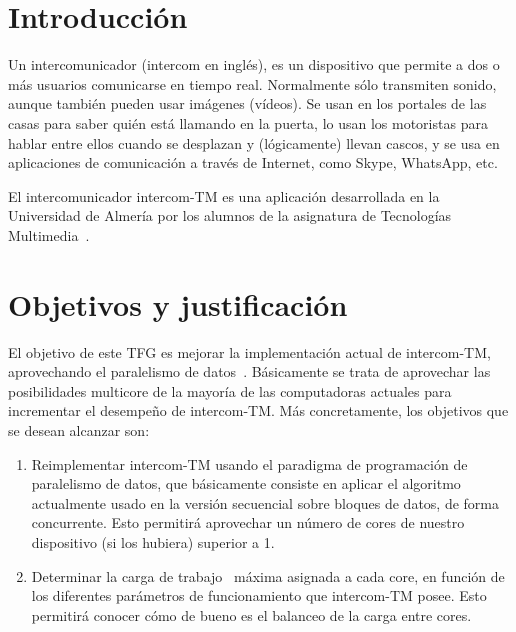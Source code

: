 \documentclass[titlepage, 12pt, a4paper, oneside]{article}
\begin{document}
\normalsize

\section{Introducción}
Un intercomunicador (intercom en inglés), es un dispositivo que
permite a dos o más usuarios comunicarse en tiempo real. Normalmente
sólo transmiten sonido, aunque también pueden usar imágenes
(vídeos). Se usan en los portales de las casas para saber quién está
llamando en la puerta, lo usan los motoristas para hablar entre ellos
cuando se desplazan y (lógicamente) llevan cascos, y se usa en
aplicaciones de comunicación a través de Internet, como Skype,
WhatsApp, etc.

El intercomunicador intercom-TM es una aplicación desarrollada en la
Universidad de Almería por los alumnos de la asignatura de Tecnologías
Multimedia~\cite{intercom-TM}.

\section{Objetivos y justificación}
El objetivo de este TFG es mejorar la implementación actual de
intercom-TM, aprovechando el paralelismo de
datos~\cite{pacheco2011introduction}. Básicamente se trata de
aprovechar las posibilidades multicore de la mayoría de las
computadoras actuales para incrementar el desempeño de
intercom-TM. Más concretamente, los objetivos que se desean alcanzar
son:
\begin{enumerate}
\item Reimplementar intercom-TM usando el paradigma de programación de
  paralelismo de datos, que básicamente consiste en aplicar el
  algoritmo actualmente usado en la versión secuencial sobre bloques
  de datos, de forma concurrente. Esto permitirá aprovechar un número
  de cores de nuestro dispositivo (si los hubiera) superior a 1.
\item Determinar la carga de trabajo~\cite{workload} máxima asignada a
  cada core, en función de los diferentes parámetros de funcionamiento
  que intercom-TM posee. Esto permitirá conocer cómo de bueno es el
  balanceo de la carga entre cores.
\end{enumerate}
\end{document}
